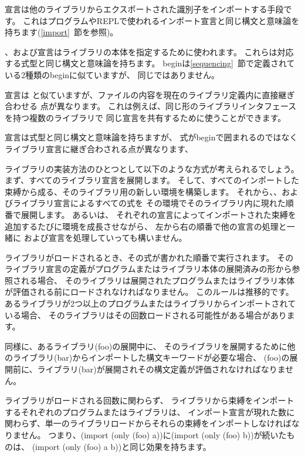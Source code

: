 宣言は他のライブラリからエクスポートされた識別子をインポートする手段です。
これはプログラムやREPLで使われるインポート宣言と同じ構文と意味論を持ちます(\ref{import}~節を参照)。

、および宣言はライブラリの本体を指定するために使われます。
これらは対応する式型と同じ構文と意味論を持ちます。
{\cf begin}は\ref{sequencing}~節で定義されている2種類の{\cf begin}に似ていますが、
同じではありません。

宣言は
と似ていますが、ファイルの内容を現在のライブラリ定義内に直接継ぎ合わせる
点が異なります。
これは例えば、同じ形のライブラリインタフェースを持つ複数のライブラリで
同じ宣言を共有するために使うことができます。

宣言は式型と同じ構文と意味論を持ちますが、
式が{\cf begin}で囲まれるのではなくライブラリ宣言に継ぎ合わされる点が異なります、


ライブラリの実装方法のひとつとして以下のような方式が考えられるでしょう。
まず、すべてのライブラリ宣言を展開します。
そして、すべてのインポートした束縛から成る、そのライブラリ用の新しい環境を構築します。
それから、、およびライブラリ宣言によるすべての式を
その環境でそのライブラリ内に現れた順番で展開します。
あるいは、
それぞれの宣言によってインポートされた束縛を追加するたびに環境を成長させながら、
左から右の順番で他の宣言の処理と一緒に
および宣言を処理していっても構いません。

ライブラリがロードされるとき、その式が書かれた順番で実行されます。
そのライブラリ宣言の定義がプログラムまたはライブラリ本体の展開済みの形から参照される場合、
そのライブラリは展開されたプログラムまたはライブラリ本体が評価される前にロードされなければなりません。
このルールは推移的です。
あるライブラリが2つ以上のプログラムまたはライブラリからインポートされている場合、
そのライブラリはその回数ロードされる可能性がある場合があります。

同様に、あるライブラリ{\cf (foo)}の展開中に、
そのライブラリを展開するために他のライブラリ{\cf (bar)}からインポートした構文キーワードが必要な場合、
{\cf (foo)}の展開前に、ライブラリ{\cf (bar)}が展開されその構文定義が評価されなければなりません。

ライブラリがロードされる回数に関わらず、
ライブラリから束縛をインポートするそれぞれのプログラムまたはライブラリは、
インポート宣言が現れた数に関わらず、単一のライブラリロードからそれらの束縛をインポートしなければなりません。
つまり、{\cf (import (only (foo) a))}に{\cf (import (only (foo) b))}が続いたものは、
{\cf (import (only (foo) a b))}と同じ効果を持ちます。

